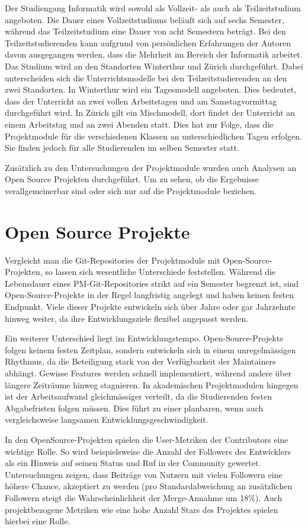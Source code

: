 Der Studiengang Informatik wird sowohl als Vollzeit- als auch als Teilzeitstudium angeboten. Die Dauer eines Vollzeitstudiums beläuft sich auf sechs Semester, während das Teilzeitstudium eine Dauer von acht Semestern beträgt. Bei den Teilzeitstudierenden kann aufgrund von persönlichen Erfahrungen der Autoren davon ausgegangen werden, dass die Mehrheit im Bereich der Informatik arbeitet. Das Studium wird an den Standorten Winterthur und Zürich durchgeführt. Dabei unterscheiden sich die Unterrichtsmodelle bei den Teilzeitstudierenden an den zwei Standorten. In Winterthur wird ein Tagesmodell angeboten. Dies bedeutet, dass der Unterricht an zwei vollen Arbeitstagen und am Samstagvormittag durchgeführt wird. In Zürich gilt ein Mischmodell, dort findet der Unterricht an einem Arbeitstag und an zwei Abenden statt. Dies hat zur Folge, dass die Projektmodule für die verschiedenen Klassen an unterschiedlichen Tagen erfolgen. Sie finden jedoch für alle Studierenden im selben Semester statt. \parencite{noauthor_bachelorstudium_nodate}\parencite{noauthor_teilzeitstudium_nodate}

Zusätzlich zu den Untersuchungen der Projektmodule wurden auch Analysen an Open Source Projekten durchgeführt. Um zu sehen, ob die Ergebnisse verallgemeinerbar sind oder sich nur auf die Projektmodule beziehen.

\section{ Open Source Projekte}
Vergleicht man die Git-Repositories der Projektmodule mit Open-Source-Projekten, so lassen sich wesentliche Unterschiede feststellen. Während die Lebensdauer eines PM-Git-Repositories strikt auf ein Semester begrenzt ist, sind Open-Source-Projekte in der Regel langfristig angelegt und haben keinen festen Endpunkt. Viele dieser Projekte entwickeln sich über Jahre oder gar Jahrzehnte hinweg weiter, da ihre Entwicklungsziele flexibel angepasst werden.

Ein weiterer Unterschied liegt im Entwicklungstempo. Open-Source-Projekte folgen keinem festen Zeitplan, sondern entwickeln sich in einem unregelmässigen Rhythmus, da die Beteiligung stark von der Verfügbarkeit der Maintainers abhängt. Gewisse Features werden schnell implementiert, während andere über längere Zeiträume hinweg stagnieren. In akademischen Projektmodulen hingegen ist der Arbeitsaufwand gleichmässiger verteilt, da die Studierenden festen Abgabefristen folgen müssen. Dies führt zu einer planbaren, wenn auch vergleichsweise langsamen Entwicklungsgeschwindigkeit.

In den OpenSource-Projekten spielen die User-Metriken der Contributors eine wichtige Rolle. So wird beispielsweise die Anzahl der Followers des Entwicklers als ein Hinweis auf seinen Status und Ruf in der Community gewertet. Untersuchungen zeigen, dass Beiträge von Nutzern mit vielen Followern eine höhere Chance, akzeptiert zu werden (pro Standardabweichung an zusätzlichen Followern steigt die Wahrscheinlichkeit der Merge-Annahme um 18\%). Auch projektbezogene Metriken wie eine hohe Anzahl Stars des Projektes spielen hierbei eine Rolle. \parencite{tsay_influence_2014}
